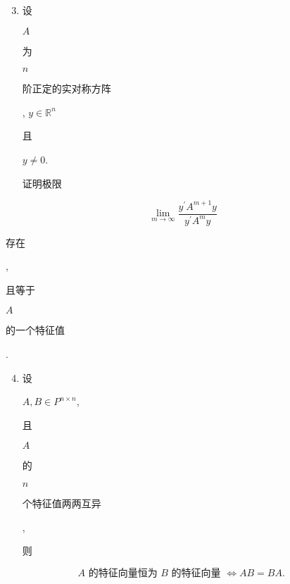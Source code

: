\documentclass[10pt]{article}
\begin{document}
\begin{enumerate}
  \setcounter{enumi}{2}
  \item \begin{CJK}{UTF8}{mj}设\end{CJK} $A$ \begin{CJK}{UTF8}{mj}为\end{CJK} $n$ \begin{CJK}{UTF8}{mj}阶正定的实对称方阵\end{CJK}, $y \in \mathbb{R}^{n}$ \begin{CJK}{UTF8}{mj}且\end{CJK} $y \neq 0$. \begin{CJK}{UTF8}{mj}证明极限\end{CJK}
\end{enumerate}
$$
\lim _{m \rightarrow \infty} \frac{y^{\prime} A^{m+1} y}{y^{\prime} A^{m} y}
$$
\begin{CJK}{UTF8}{mj}存在\end{CJK}, \begin{CJK}{UTF8}{mj}且等于\end{CJK} $A$ \begin{CJK}{UTF8}{mj}的一个特征值\end{CJK}.

\begin{enumerate}
  \setcounter{enumi}{3}
  \item \begin{CJK}{UTF8}{mj}设\end{CJK} $A, B \in P^{n \times n}$, \begin{CJK}{UTF8}{mj}且\end{CJK} $A$ \begin{CJK}{UTF8}{mj}的\end{CJK} $n$ \begin{CJK}{UTF8}{mj}个特征值两两互异\end{CJK}, \begin{CJK}{UTF8}{mj}则\end{CJK}
\end{enumerate}
$$
A \text { 的特征向量恒为 } B \text { 的特征向量 } \Leftrightarrow A B=B A \text {. }
$$
\end{document}
